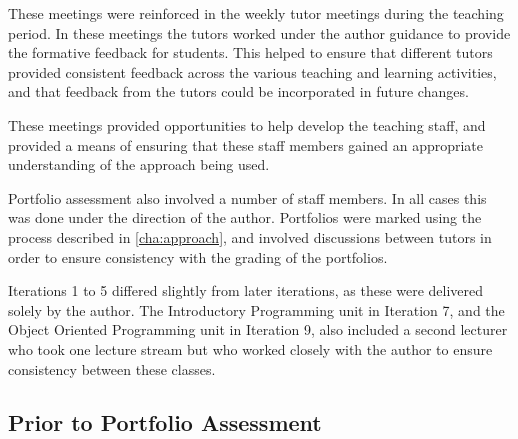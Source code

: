 These meetings were reinforced in the weekly tutor meetings during the teaching period. In these meetings the tutors worked under the author guidance to provide the formative feedback for students. This helped to ensure that different tutors provided consistent feedback across the various teaching and learning activities, and that feedback from the tutors could be incorporated in future changes.

These meetings provided opportunities to help develop the teaching staff, and provided a means of ensuring that these staff members gained an appropriate understanding of the approach being used.

Portfolio assessment also involved a number of staff members. In all cases this was done under the direction of the author. Portfolios were marked using the process described in \cref{cha:approach}, and involved discussions between tutors in order to ensure consistency with the grading of the portfolios.

Iterations 1 to 5 differed slightly from later iterations, as these were delivered solely by the author. The Introductory Programming unit in Iteration 7, and the Object Oriented Programming unit in Iteration 9, also included a second lecturer who took one lecture stream but who worked closely with the author to ensure consistency between these classes. 

\clearpage



\subsection{Prior to Portfolio Assessment} %
\label{sub:prior_to_portfolio_assessment}

